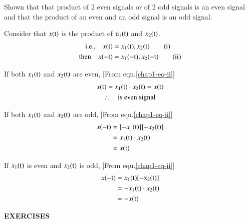 \begin{exam*}
Shown that that product of 2 even signals or of 2 odd signals is an even signal and that the product of an even and an odd signal is an odd signal.
\end{exam*}
\begin{solution}
Consider that $x(\textrm{t})$ is the product of $\textrm{u}_{1}(\textrm{t})$ and $x_{2}(\textrm{t})$.
\begin{align*}
\text{i.e.,}\quad x(\textrm{t}) &= x_{1}(\textrm{t}), x_{2}(\textrm{t})\tag{i}\label{chap1-eq-i}\\
\text{then}\quad x(-\textrm{t}) &=x_{1}(-\textrm{t}), x_{2}(-\textrm{t})\tag{ii}\label{chap1-eq-ii}
\end{align*}

If both $x_{1}(\textrm{t})$ and $x_{2}(\textrm{t})$ are even, [From eqn.\eqref{chap1-eq-ii}]
\begin{gather*}
x(\textrm{t})=x_{1}(\textrm{t})\cdot x_{2}(\textrm{t})= x(\textrm{t})\\
\therefore\quad \text{is even signal}
\end{gather*}

If both $x_{1}(\textrm{t})$ and $x_{2}(\textrm{t})$ are odd, [From eqn.\eqref{chap1-eq-ii}]
\begin{align*}
x(-\textrm{t}) &=[-x_{1}(\textrm{t})][-x_{2}(\textrm{t})]\\
         &=x_{1}(\textrm{t})\cdot x_{2}(\textrm{t})\\
         &=x(\textrm{t})
\end{align*}

If $x_{1}(\textrm{t})$ is even and $x_{2}(\textrm{t})$ is odd, [From equ.\eqref{chap1-eq-ii}]
\begin{align*}
x(-\textrm{t}) &=x_{1}(\textrm{t})[-\textrm{x}_{2}(\textrm{t})]\\
         &=-x_{1}(\textrm{t})\cdot x_{2}(\textrm{t})\\
         &=-x(\textrm{t})
\end{align*}
\end{solution}


{\bfseries  EXERCISES}

